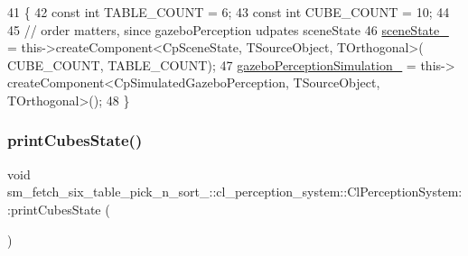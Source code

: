 \begin{DoxyCode}
41             \{
42                 \textcolor{keyword}{const} \textcolor{keywordtype}{int} TABLE\_COUNT = 6;
43                 \textcolor{keyword}{const} \textcolor{keywordtype}{int} CUBE\_COUNT = 10;
44 
45                 \textcolor{comment}{// order matters, since gazeboPerception udpates sceneState}
46                 \hyperlink{classsm__fetch__six__table__pick__n__sort__1_1_1cl__perception__system_1_1ClPerceptionSystem_abf68c35d49ab0c766521e23f4e3b4d41}{sceneState\_} = this->createComponent<CpSceneState, TSourceObject, TOrthogonal>(
      CUBE\_COUNT, TABLE\_COUNT);
47                 \hyperlink{classsm__fetch__six__table__pick__n__sort__1_1_1cl__perception__system_1_1ClPerceptionSystem_a35f95a434ce0c5c8f1a0d3b35cc69035}{gazeboPerceptionSimulation\_} = this->
      createComponent<CpSimulatedGazeboPerception, TSourceObject, TOrthogonal>();
48             \}
\end{DoxyCode}
\mbox{\label{classsm__fetch__six__table__pick__n__sort__1_1_1cl__perception__system_1_1ClPerceptionSystem_af3da61c8b8f5ec1686657a1c6dc18f0b}} 
\subsubsection{\texorpdfstring{print\+Cubes\+State()}{printCubesState()}}
{\footnotesize\ttfamily void sm\+\_\+fetch\+\_\+six\+\_\+table\+\_\+pick\+\_\+n\+\_\+sort\+\_\+::cl\+\_\+perception\+\_\+system\+::\+Cl\+Perception\+System\+::print\+Cubes\+State (\begin{DoxyParamCaption}{ }\end{DoxyParamCaption})\hspace{0.3cm}{\ttfamily [inline]}}



